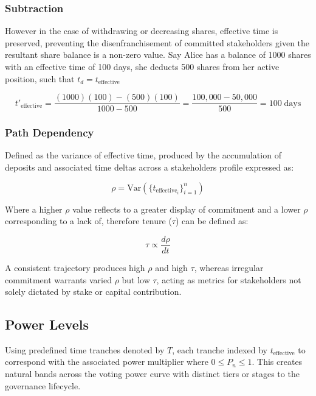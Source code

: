 \documentclass[a4paper,12pt]{article}
\begin{document}
\subsubsection{\signifier Subtraction}

However in the case of withdrawing or decreasing shares, effective time is preserved, preventing the disenfranchisement of committed stakeholders given the resultant share balance is a non-zero value. Say Alice has a balance of 1000 shares with an effective time of 100 days, she deducts 500 shares from her active position, such that $t_d = t_\text{effective}$

\begin{equation*}
{t'}_{\text{effective}} = \frac{(1000)(100) - (500)(100)}{1000 - 500} 
= \frac{100{,}000 - 50{,}000}{500} 
= 100 \; \text{days}
\end{equation*}

\subsubsection{\signifier Path Dependency}
Defined as the variance of effective time, produced by the accumulation of deposits and associated time deltas across a stakeholders profile expressed as:

\begin{equation}
\rho = \text{Var}(\{t_{\text{effective}_i}\}_{i = 1}^{n})
\end{equation}

\vspace{10pt}

Where a higher $\rho$ value reflects to a greater display of commitment and a lower $\rho$ corresponding to a lack of, therefore tenure ($\tau$) can be defined as:

\begin{equation}
    \tau \propto \frac{d\rho}{dt}
\end{equation}

\vspace{10pt}

A consistent trajectory produces high $\rho$ and high $\tau$, whereas irregular commitment warrants varied $\rho$ but low $\tau$, acting as metrics for stakeholders not solely dictated by stake or capital contribution.

\subsection{\signifier Power Levels}
Using predefined time tranches denoted by $T$, each tranche indexed by $t_{\text{effective}}$ to correspond with the associated power multiplier where $0 \leq P_n \leq 1$. This creates natural bands across the voting power curve with distinct tiers or stages to the governance lifecycle. 
\end{document}
